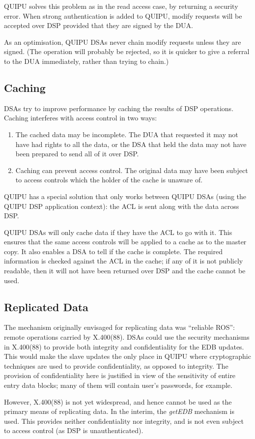 QUIPU solves this problem as in the read access case, 
by returning a security error.
When strong authentication is added to QUIPU, modify requests will be
accepted over DSP provided that they are signed by the DUA.

As an optimisation, QUIPU DSAs never chain modify requests unless they are
signed. (The operation will probably be rejected, so it is quicker to
give a referral to the DUA immediately, rather than trying to chain.)

\subsection{Caching}
\label{dsp-acl}

DSAs try to improve performance by caching the results of DSP operations.
Caching interferes with access control in two ways:

\begin{enumerate}
\item
The cached data may be incomplete.
The DUA that requested it may not have had
rights to all the data, or the DSA that held the data may not have been
prepared to send all of it over DSP.
\item
Caching can prevent access control.
The original data may have been subject to access controls which the holder of
the cache is unaware of.
\end{enumerate}

QUIPU has a special solution that only works between QUIPU DSAs (using the
QUIPU DSP application context): the ACL is sent along with the data across
DSP.

QUIPU DSAs will only cache data if they have the ACL to go with it.
This ensures 
that the same access controls will be applied to a cache as to the master copy.
It also enables a DSA to tell if the cache is complete. The required
information 
is checked against the ACL in the cache; if any of it is not publicly readable,
then it will not have been returned over DSP and the cache cannot be used.

\subsection{Replicated Data}

The mechanism originally envisaged for replicating data was ``reliable
ROS'':  remote operations carried by X.400(88). DSAs could use the security
mechanisms in X.400(88) to provide both integrity and confidentiality
for the EDB updates.
This would make the slave updates the only place in QUIPU where cryptographic 
techniques are used to provide confidentiality, as opposed to integrity. The
provision of confidentiality here is justified in view of the sensitivity of
entire entry data blocks; many of them will contain user's passwords, for
example.

However, X.400(88) is not yet widespread, and hence cannot be used as the
primary means of replicating data. In the interim, the {\em getEDB} mechanism
is used. This provides neither confidentiality nor integrity, and is
not even subject to access control (as DSP is unauthenticated).

